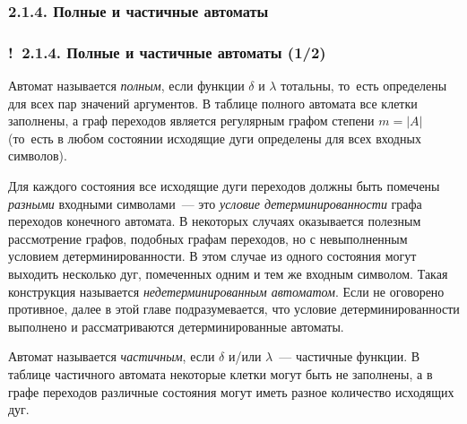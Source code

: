 \documentclass[mathserif,12pt,aspectratio=169]{beamer}
\def\emразделенной{\em разделенной}
\renewcommand{\index}[1]{}
\def\em#1{\it\color{blue}#1}
\def\odmkey#1#2{{\it\color{red} #1}\index{#2}}
\def\Ok{{\color{green}\textbf{!}\ }}
\begin{document}
\subsubsection{2.1.4. Полные и частичные автоматы}\label{2.1.4.}
\begin{frame}
\frametitle{\Ok 2.1.4. Полные и частичные автоматы (1/2)}

Автомат называется \odmkey{полным}{Автомат!полный}, если функции
$\delta$ и $\lambda$ тотальны, то~есть определены для всех пар
значений аргументов. В таблице полного автомата все клетки
заполнены, а граф переходов является регулярным графом степени $m=|A|$ 
(то~есть в любом состоянии исходящие дуги определены для всех
входных символов).

\begin{remark}
Для каждого состояния все исходящие дуги переходов должны быть
помечены {\em разными} входными символами~--- это \odmkey{условие
детерминированности}{Условие!детерминированности} графа переходов
конечного автомата. В некоторых случаях оказывается полезным
рассмотрение графов, подобных графам переходов, но с невыполненным
условием детерминированности. В этом случае из одного состояния
могут выходить несколько дуг, помеченных одним и тем же входным
символом. Такая конструкция называется \odmkey{недетерминированным
автоматом}{Автомат!недетерминированный}. Если не оговорено
противное, далее в этой главе подразумевается, что условие
детерминированности выполнено и рассматриваются детерминированные
автоматы.
\end{remark}

\medskip
Автомат называется \odmkey{частичным}{Автомат!частичный},  если
$\delta$ и/или $\lambda$~---  частичные функции. В таблице
частичного автомата некоторые клетки могут быть не заполнены, а в
графе переходов различные состояния могут иметь разное количество
исходящих дуг.
\end{frame}
\end{document}
